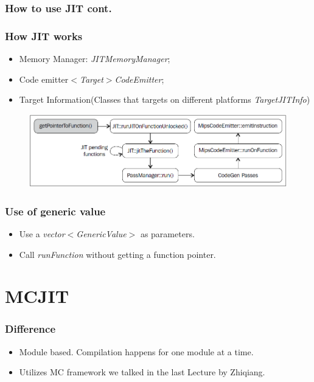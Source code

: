 \documentclass{beamer}
\begin{document}
\begin{frame}
\frametitle{How to use JIT cont.}
\JITCodeOne
\end{frame}

\begin{frame}
\frametitle{How JIT works}
	\begin{itemize}
		\item Memory Manager: \textit{JITMemoryManager};
		\item Code emitter\textit{$<$Target$>$CodeEmitter};
		\item Target Information(Classes that targets on different platforms \textit{TargetJITInfo})
	\end{itemize}
	\begin{figure}
		\centering
		 \includegraphics{./pic/flow}
	\end{figure}
\end{frame}

\begin{frame}
\frametitle{Use of generic value}
\begin{itemize}
	\item Use a \textit{vector$<$GenericValue$>$} as parameters.
	\item Call \textit{runFunction} without getting a function pointer.
\end{itemize}
\JITCodeTwo
\end{frame}

\section{MCJIT}
\begin{frame}
\frametitle{Difference}
\begin{itemize}
	\item Module based. Compilation happens for one module at a time.
	\item Utilizes MC framework we talked in the last Lecture by Zhiqiang.
\end{itemize}
\end{frame}
\end{document}
